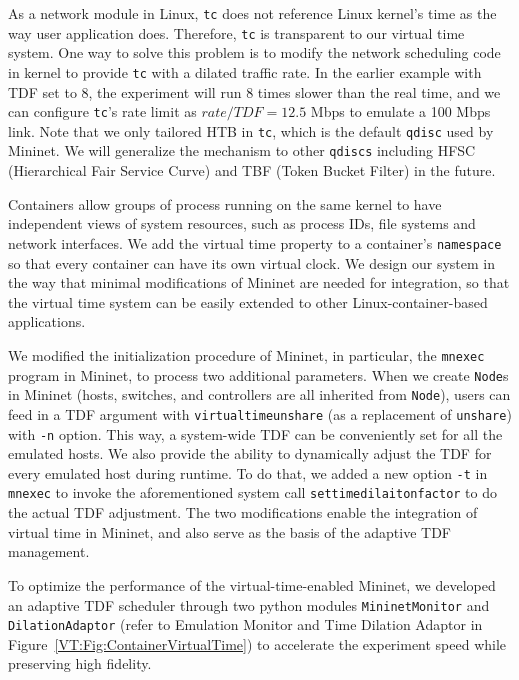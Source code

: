 As a network module in Linux, \texttt{tc} does not reference Linux kernel's time as the way user application does. 
Therefore, \texttt{tc} is transparent to our virtual time system. One way to solve this problem is to modify the network scheduling code in kernel to provide \texttt{tc} with a dilated traffic rate. 
In the earlier example with TDF set to 8, the experiment will run 8 times slower than the real time, and we can configure \texttt{tc}'s rate limit as $rate/TDF=12.5$ Mbps to emulate a 100 Mbps link. 
Note that we only tailored HTB in \texttt{tc}, which is the default \texttt{qdisc} used by Mininet. 
We will generalize the mechanism to other \texttt{qdiscs} including HFSC (Hierarchical Fair Service Curve) and TBF (Token Bucket Filter) in the future.

\label{VT:SubSec:ImplementMininet}
Containers allow groups of process running on the same kernel to have independent views of system resources, such as process IDs, file systems and network interfaces. 
We add the virtual time property to a container's \texttt{namespace}~\cite{LinuxNamespace} so that every container can have its own virtual clock. 
We design our system in the way that minimal modifications of Mininet are needed for integration, so that the virtual time system can be easily extended to other Linux-container-based applications. 

We modified the initialization procedure of Mininet, in particular, the \texttt{mnexec} program in Mininet, to process two additional parameters. 
When we create \texttt{Node}s in Mininet (hosts, switches, and controllers are all inherited from \texttt{Node}), users can feed in a TDF argument with \texttt{virtualtimeunshare} (as a replacement of \texttt{unshare}) with \texttt{-n} option. 
This way, a system-wide TDF can be conveniently set for all the emulated hosts. We also provide the ability to dynamically adjust the TDF for every emulated host during runtime. 
To do that, we added a new option \texttt{-t} in \texttt{mnexec} to invoke the aforementioned system call \texttt{settimedilaitonfactor} to do the actual TDF adjustment. 
The two modifications enable the integration of virtual time in Mininet, and also serve as the basis of the adaptive TDF management.

To optimize the performance of the virtual-time-enabled Mininet, we developed an adaptive TDF scheduler
through two python modules \texttt{MininetMonitor} and \texttt{DilationAdaptor}
(refer to Emulation Monitor and Time Dilation Adaptor in Figure~\ref{VT:Fig:ContainerVirtualTime})
to accelerate the experiment speed while preserving high fidelity.

